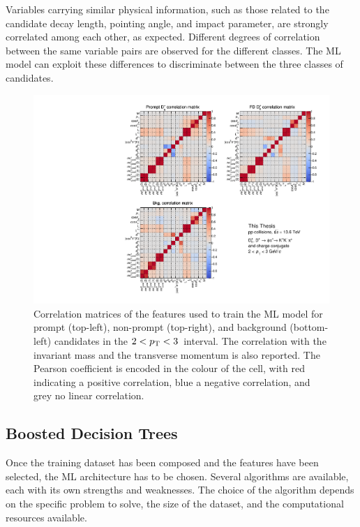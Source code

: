 Variables carrying similar physical information, such as those related to the candidate decay length, pointing angle, and impact parameter, are strongly correlated among each other, as expected. Different degrees of correlation between the same variable pairs are observed for the different classes. The ML model can exploit these differences to discriminate between the three classes of candidates.

\begin{figure}[p]
    \centering
    \includegraphics[width=\textwidth]{Figures/Chapter 5/CorrelationMatrix.pdf}
    \caption{Correlation matrices of the features used to train the ML model for prompt \ds (top-left), non-prompt \ds (top-right), and background (bottom-left) candidates in the $2<p_\mathrm{T}<3$~\gevc interval. The correlation with the invariant mass and the transverse momentum is also reported. The Pearson coefficient is encoded in the colour of the cell, with red indicating a positive correlation, blue a negative correlation, and grey no linear correlation.}
    \label{fig:ml_training_vars}
\end{figure}

\subsection{Boosted Decision Trees}
Once the training dataset has been composed and the features have been selected, the ML architecture has to be chosen. Several algorithms are available, each with its own strengths and weaknesses. The choice of the algorithm depends on the specific problem to solve, the size of the dataset, and the computational resources available. 

